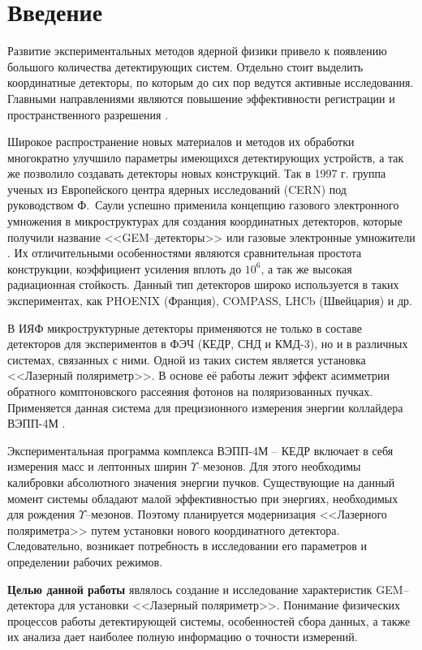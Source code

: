 \chapter*{Введение}
\label{sec:intro}
Развитие экспериментальных методов ядерной физики привело к появлению большого количества детектирующих систем. Отдельно стоит выделить координатные детекторы, по которым до сих пор ведутся активные исследования. Главными направлениями являются повышение эффективности регистрации и пространственного разрешения \cite{shechtman}.
\par Широкое распространение новых материалов и методов их обработки многократно улучшило параметры имеющихся детектирующих устройств, а так же позволило создавать детекторы новых конструкций. Так в 1997 г. группа ученых из Европейского центра ядерных исследований (CERN) под руководством Ф.~Саули успешно применила концепцию газового электронного умножения в микроструктурах для создания координатных детекторов, которые получили название <<GEM--детекторы>> или газовые электронные умножители \cite{sauli}. Их отличительными особенностями являются сравнительная простота конструкции, коэффициент усиления вплоть до $10^6$, а так же высокая радиационная стойкость. Данный тип детекторов широко используется в таких экспериментах, как PHOENIX (Франция), COMPASS, LHCb (Швейцария) и др.
\par В ИЯФ микроструктурные детекторы применяются не только в составе детекторов для экспериментов в ФЭЧ (КЕДР, СНД и КМД-3), но и в различных системах, связанных с ними. Одной из таких систем является установка <<Лазерный поляриметр>>. В основе её работы лежит эффект асимметрии обратного комптоновского рассеяния фотонов на поляризованных пучках. Применяется данная система для прецизионного измерения энергии коллайдера ВЭПП-4М \cite{nikitin-nikolaev}.
\par Экспериментальная программа комплекса ВЭПП-4М -- КЕДР включает в себя измерения масс и лептонных ширин $\Upsilon$--мезонов. Для этого необходимы калибровки абсолютного значения энергии пучков. Существующие на данный момент системы обладают малой эффективностью при энергиях, необходимых для рождения $\Upsilon$--мезонов. Поэтому планируется модернизация <<Лазерного поляриметра>> путем установки нового координатного детектора. Следовательно, возникает потребность в исследовании его параметров и определении рабочих режимов.
\par \textbf{Целью данной работы} являлось создание и исследование характеристик GEM--детектора для установки <<Лазерный поляриметр>>. Понимание физических процессов работы детектирующей системы, особенностей сбора данных, а также их анализа дает наиболее полную информацию о точности измерений.  

